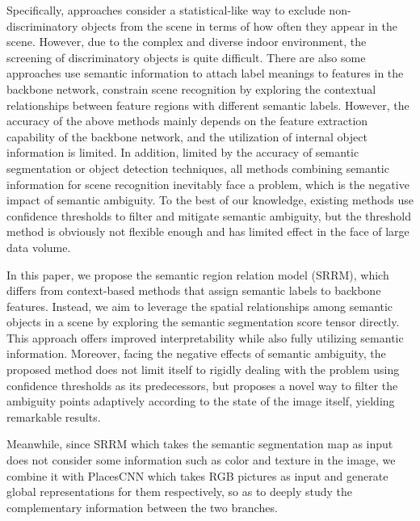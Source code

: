 \documentclass[conference]{IEEEtran}
\begin{document}
Specifically, approaches\cite{ref7,ref18,ref23} consider a statistical-like way to exclude non-discriminatory objects from the scene in terms of how often they appear in the scene. However, due to the complex and diverse indoor environment, the screening of discriminatory objects is quite difficult. There are also some approaches\cite{ref17,ref19} use semantic information to attach label meanings to features in the backbone network, constrain scene recognition by exploring the contextual relationships between feature regions with different semantic labels. However, the accuracy of the above methods mainly depends on the feature extraction capability of the backbone network, and the utilization of internal object information is limited. In addition, limited by the accuracy of semantic segmentation or object detection techniques, all methods combining semantic information for scene recognition inevitably face a problem, which is the negative impact of semantic ambiguity. To the best of our knowledge, existing methods use confidence thresholds to filter and mitigate semantic ambiguity, but the threshold method is obviously not flexible enough and has limited effect in the face of large data volume.

In this paper, we propose the semantic region relation model (SRRM), which differs from context-based methods that assign semantic labels to backbone features. Instead, we  aim to leverage the spatial relationships among semantic objects in a scene by exploring the semantic segmentation score tensor directly. This approach offers improved interpretability while also fully utilizing semantic information. Moreover, facing the negative effects of semantic ambiguity, the proposed method does not limit itself to rigidly dealing with the problem using confidence thresholds as its predecessors, but proposes a novel way to filter the ambiguity points adaptively according to the state of the image itself, yielding remarkable results.

Meanwhile, since SRRM which takes the semantic segmentation map as input does not consider some information such as color and texture in the image, we combine it with PlacesCNN which takes RGB pictures as input and generate global representations for them respectively, so as to deeply study the complementary information between the two branches.
\end{document}

